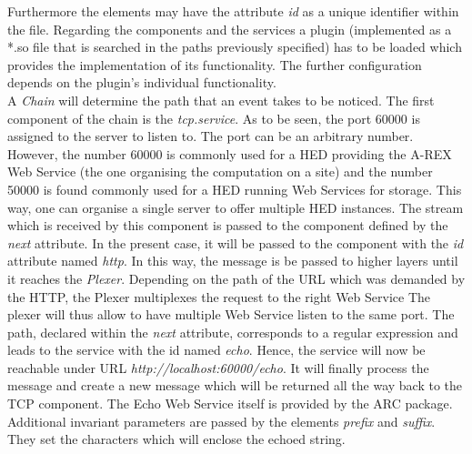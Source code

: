 Furthermore the elements may have the attribute \textit{id} as a unique identifier within the file.
Regarding the components and the services a plugin (implemented as a *.so file that is searched in the paths previously specified) has to be loaded which provides the implementation of its functionality. The further configuration depends on the plugin's individual functionality.\\
%
%


A \textit{Chain} will determine the path that an event takes to be noticed.
The first component of the chain is the \textit{tcp.service}.
As to be seen, the port 60000 is assigned to the server to listen to.
The port can be an arbitrary number.
However, the number 60000 is commonly used for a HED providing the A-REX Web Service (the one organising the computation on a site) and the number 50000 is found commonly used for a HED running Web Services for storage.
This way, one can organise a single server to offer multiple HED instances.
The stream which is received by this component is passed to the component defined by the \textit{next} attribute.
In the present case, it will be passed to the component with the \textit{id} attribute named \textit{http}.
In this way, the message is be passed to higher layers until it reaches the \textit{Plexer}.
Depending on the path of the URL which was demanded by the HTTP, the Plexer multiplexes the request to the right Web Service
The plexer will thus allow to have multiple Web Service listen to the same port.
The path, declared within the \textit{next} attribute, corresponds to a regular expression and leads to the service with the id named \textit{echo}. 
Hence, the service will now be reachable under URL \textit{http://localhost:60000/echo}.
It will finally process the message and create a new message which will be returned all the way back to the TCP component.
The Echo Web Service itself is provided by the ARC package.
Additional invariant parameters are passed by the elements \textit{prefix} and \textit{suffix}.
They set the characters which will enclose the echoed string.

